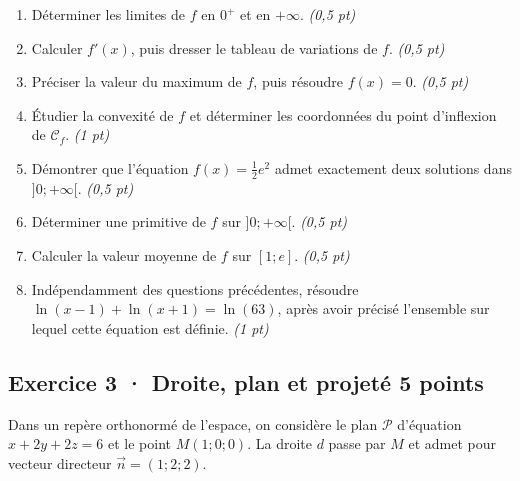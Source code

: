 \begin{enumerate}

\item Déterminer les limites de $f$ en $0^+$ et en $+\infty$. \hfill\textit{(0{,}5 pt)}

\item Calculer $f' (x)$, puis dresser le tableau de variations de $f$. \hfill\textit{(0{,}5 pt)}

\item Préciser la valeur du maximum de $f$, puis résoudre $f(x)=0$. \hfill\textit{(0{,}5 pt)}

\item Étudier la convexité de $f$ et déterminer les coordonnées du point d'inflexion de $\mathcal C_f$. \hfill\textit{(1 pt)}

\item Démontrer que l'équation $f(x)=\frac12 e^{2}$ admet exactement deux solutions dans $]0;+\infty[$. \hfill\textit{(0{,}5 pt)}

\item Déterminer une primitive de $f$ sur $]0;+\infty[$. \hfill\textit{(0{,}5 pt)}

\item Calculer la valeur moyenne de $f$ sur $[1;e]$. \hfill\textit{(0{,}5 pt)}

\item Indépendamment des questions précédentes, résoudre $\ln(x-1)+\ln(x+1)=\ln(63)$, après avoir précisé l'ensemble sur lequel cette équation est définie. \hfill\textit{(1 pt)}

\end{enumerate}

\mxnewpage{}\par

\subsection*{Exercice 3 · Droite, plan et projeté \hfill 5 points}Dans un repère orthonormé de l'espace, on considère le plan $\mathcal P$ d'équation $x+2y+2z=6$ et le point $M(1;0;0)$. La droite $d$ passe par $M$ et admet pour vecteur directeur $\vec n=(1;2;2)$.

